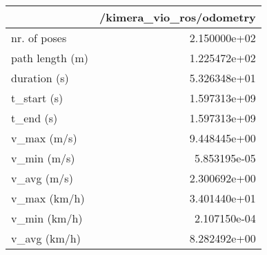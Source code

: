 \begin{tabular}{lr}
\toprule
{} &  /kimera\_vio\_ros/odometry \\
\midrule
nr. of poses    &              2.150000e+02 \\
path length (m) &              1.225472e+02 \\
duration (s)    &              5.326348e+01 \\
t\_start (s)     &              1.597313e+09 \\
t\_end (s)       &              1.597313e+09 \\
v\_max (m/s)     &              9.448445e+00 \\
v\_min (m/s)     &              5.853195e-05 \\
v\_avg (m/s)     &              2.300692e+00 \\
v\_max (km/h)    &              3.401440e+01 \\
v\_min (km/h)    &              2.107150e-04 \\
v\_avg (km/h)    &              8.282492e+00 \\
\bottomrule
\end{tabular}
